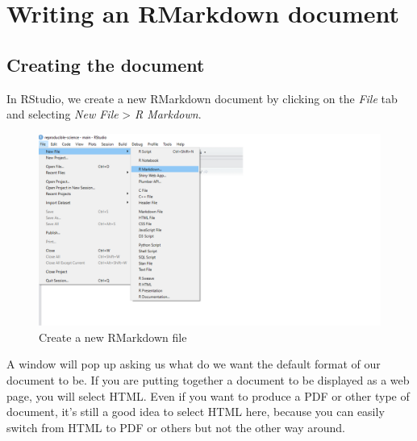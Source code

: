 \documentclass[
]{book}
\begin{document}
\hypertarget{writing-an-rmarkdown-document}{%
\section{Writing an RMarkdown document}\label{writing-an-rmarkdown-document}}

\hypertarget{creating-the-document}{%
\subsection{Creating the document}\label{creating-the-document}}

In RStudio, we create a new RMarkdown document by clicking on the \emph{File} tab
and selecting \emph{New File} \textgreater{} \emph{R Markdown}.

\begin{figure}

{\centering \includegraphics[width=1\linewidth]{img/rmarkdown1} 

}

\caption{Create a new RMarkdown file}\label{fig:rmarkdown1}
\end{figure}

A window will pop up asking us what do we want the default format of our
document to be. If you are putting together a document to be displayed as a web
page, you will select HTML. Even if you want to produce a PDF or other type of
document, it's still a good idea to select HTML here, because you can easily
switch from HTML to PDF or others but not the other way around.
\end{document}
